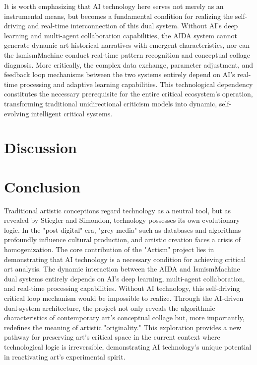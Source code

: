 \documentclass{article}
\begin{document}
It is worth emphasizing that AI technology here serves not merely as an instrumental means, but becomes a fundamental condition for realizing the self-driving and real-time interconnection of this dual system. Without AI's deep learning and multi-agent collaboration capabilities, the AIDA system cannot generate dynamic art historical narratives with emergent characteristics, nor can the IsmismMachine conduct real-time pattern recognition and conceptual collage diagnosis. More critically, the complex data exchange, parameter adjustment, and feedback loop mechanisms between the two systems entirely depend on AI's real-time processing and adaptive learning capabilities. This technological dependency constitutes the necessary prerequisite for the entire critical ecosystem's operation, transforming traditional unidirectional criticism models into dynamic, self-evolving intelligent critical systems.


\section{Discussion}


\section{Conclusion}

Traditional artistic conceptions regard technology as a neutral tool, but as revealed by Stiegler and Simondon, technology possesses its own evolutionary logic. In the "post-digital" era, "grey media" such as databases and algorithms profoundly influence cultural production, and artistic creation faces a crisis of homogenization.
The core contribution of the "Artism" project lies in demonstrating that AI technology is a necessary condition for achieving critical art analysis. The dynamic interaction between the AIDA and IsmismMachine dual systems entirely depends on AI's deep learning, multi-agent collaboration, and real-time processing capabilities. Without AI technology, this self-driving critical loop mechanism would be impossible to realize.
Through the AI-driven dual-system architecture, the project not only reveals the algorithmic characteristics of contemporary art's conceptual collage but, more importantly, redefines the meaning of artistic "originality." This exploration provides a new pathway for preserving art's critical space in the current context where technological logic is irreversible, demonstrating AI technology's unique potential in reactivating art's experimental spirit.



\end{document}
